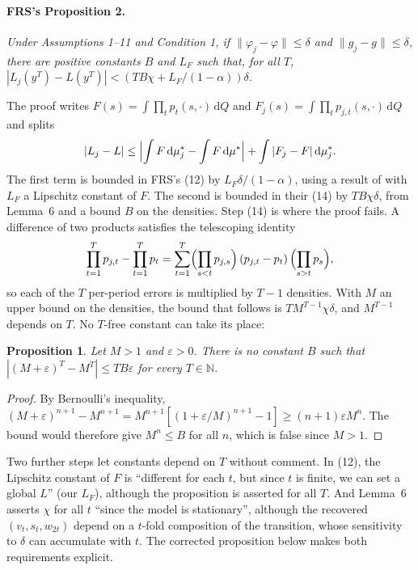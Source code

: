 \documentclass[11pt]{article}
\newtheorem{proposition}[theorem]{Proposition}
\theoremstyle{definition}
\theoremstyle{remark}
\newcommand{\dd}{\mathrm{d}}
\begin{document}
\paragraph{FRS's Proposition 2.} \emph{Under Assumptions 1--11 and Condition 1, if
$\|\varphi_j - \varphi\| \le \delta$ and $\|g_j - g\| \le \delta$, there are positive constants
$B$ and $L_F$ such that, for all $T$, $|L_j(y^T) - L(y^T)| < (TB\chi + L_F/(1-\alpha))\delta$.}

\medskip
The proof writes $F(s) = \int\prod_t p_t(s,\cdot)\,\dd Q$ and
$F_j(s) = \int\prod_t p_{j,t}(s,\cdot)\,\dd Q$ and splits
\[
  |L_j - L| \le \Bigl|\int F\,\dd\mu_j^* - \int F\,\dd\mu^*\Bigr| + \int |F_j - F|\,\dd\mu_j^* .
\]
The first term is bounded in FRS's (12) by $L_F\delta/(1-\alpha)$, using a result of
\citet{SantosPeraltaAlva2005} with $L_F$ a Lipschitz constant of $F$. The second is bounded in their
(14) by $TB\chi\delta$, from Lemma~6 and a bound $B$ on the densities. Step (14) is where the
proof fails. A difference of two products satisfies the telescoping identity
\begin{equation}\label{eq:telescope}
  \prod_{t=1}^T p_{j,t} - \prod_{t=1}^T p_t
  = \sum_{t=1}^T \Bigl(\prod_{s<t} p_{j,s}\Bigr)\,(p_{j,t} - p_t)\,\Bigl(\prod_{s>t} p_s\Bigr),
\end{equation}
so each of the $T$ per-period errors is multiplied by $T-1$ densities. With $M$ an upper bound on
the densities, the bound that follows is $TM^{T-1}\chi\delta$, and $M^{T-1}$ depends on $T$. No
$T$-free constant can take its place:

\begin{proposition}\label{prop:gap}
Let $M > 1$ and $\varepsilon > 0$. There is no constant $B$ such that
$|(M+\varepsilon)^T - M^T| \le TB\varepsilon$ for every $T \in \mathbb{N}$.
\end{proposition}

\begin{proof}
By Bernoulli's inequality, $(M + \varepsilon)^{n+1} - M^{n+1} = M^{n+1}[(1 + \varepsilon/M)^{n+1}
- 1] \ge (n+1)\varepsilon M^n$. The bound would therefore give $M^n \le B$ for all $n$, which is
false since $M > 1$.
\end{proof}

Two further steps let constants depend on $T$ without comment. In (12), the Lipschitz constant of
$F$ is ``different for each $t$, but since $t$ is finite, we can set a global $L$'' (our $L_F$), although the
proposition is asserted for all $T$. And Lemma~6 asserts $\chi$ for all $t$ ``since the model is
stationary'', although the recovered $(v_t, s_t, w_{2t})$ depend on a $t$-fold composition of the
transition, whose sensitivity to $\delta$ can accumulate with $t$. The corrected proposition below
makes both requirements explicit.
\end{document}
